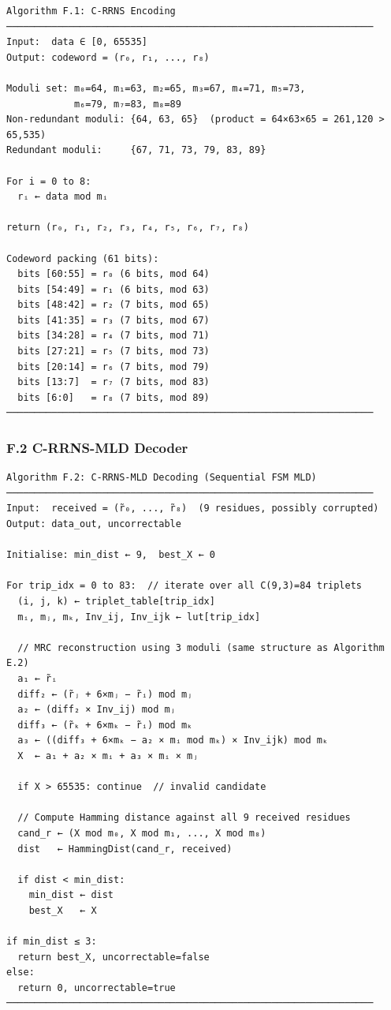 \begin{verbatim}
Algorithm F.1: C-RRNS Encoding
─────────────────────────────────────────────────────────────────
Input:  data ∈ [0, 65535]
Output: codeword = (r₀, r₁, ..., r₈)

Moduli set: m₀=64, m₁=63, m₂=65, m₃=67, m₄=71, m₅=73,
            m₆=79, m₇=83, m₈=89
Non-redundant moduli: {64, 63, 65}  (product = 64×63×65 = 261,120 > 65,535)
Redundant moduli:     {67, 71, 73, 79, 83, 89}

For i = 0 to 8:
  rᵢ ← data mod mᵢ

return (r₀, r₁, r₂, r₃, r₄, r₅, r₆, r₇, r₈)

Codeword packing (61 bits):
  bits [60:55] = r₀ (6 bits, mod 64)
  bits [54:49] = r₁ (6 bits, mod 63)
  bits [48:42] = r₂ (7 bits, mod 65)
  bits [41:35] = r₃ (7 bits, mod 67)
  bits [34:28] = r₄ (7 bits, mod 71)
  bits [27:21] = r₅ (7 bits, mod 73)
  bits [20:14] = r₆ (7 bits, mod 79)
  bits [13:7]  = r₇ (7 bits, mod 83)
  bits [6:0]   = r₈ (7 bits, mod 89)
─────────────────────────────────────────────────────────────────
\end{verbatim}

\subsubsection{F.2 C-RRNS-MLD Decoder}\label{f.2-c-rrns-mld-decoder}

\begin{verbatim}
Algorithm F.2: C-RRNS-MLD Decoding (Sequential FSM MLD)
─────────────────────────────────────────────────────────────────
Input:  received = (r̃₀, ..., r̃₈)  (9 residues, possibly corrupted)
Output: data_out, uncorrectable

Initialise: min_dist ← 9,  best_X ← 0

For trip_idx = 0 to 83:  // iterate over all C(9,3)=84 triplets
  (i, j, k) ← triplet_table[trip_idx]
  mᵢ, mⱼ, mₖ, Inv_ij, Inv_ijk ← lut[trip_idx]

  // MRC reconstruction using 3 moduli (same structure as Algorithm E.2)
  a₁ ← r̃ᵢ
  diff₂ ← (r̃ⱼ + 6×mⱼ − r̃ᵢ) mod mⱼ
  a₂ ← (diff₂ × Inv_ij) mod mⱼ
  diff₃ ← (r̃ₖ + 6×mₖ − r̃ᵢ) mod mₖ
  a₃ ← ((diff₃ + 6×mₖ − a₂ × mᵢ mod mₖ) × Inv_ijk) mod mₖ
  X  ← a₁ + a₂ × mᵢ + a₃ × mᵢ × mⱼ

  if X > 65535: continue  // invalid candidate

  // Compute Hamming distance against all 9 received residues
  cand_r ← (X mod m₀, X mod m₁, ..., X mod m₈)
  dist   ← HammingDist(cand_r, received)

  if dist < min_dist:
    min_dist ← dist
    best_X   ← X

if min_dist ≤ 3:
  return best_X, uncorrectable=false
else:
  return 0, uncorrectable=true
─────────────────────────────────────────────────────────────────
\end{verbatim}

